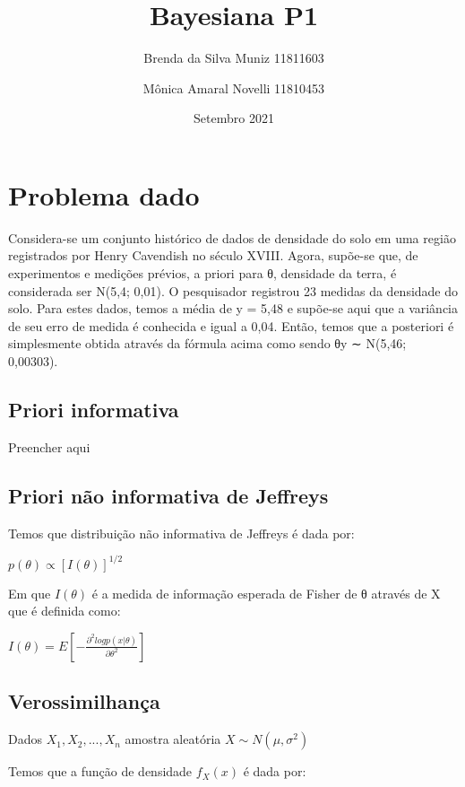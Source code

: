 \documentclass[
]{article}
\title{Bayesiana P1}
\author{Brenda da Silva Muniz 11811603 \and Mônica Amaral Novelli 11810453}
\date{Setembro 2021}
\begin{document}
\maketitle

\hypertarget{problema-dado}{%
\section{Problema dado}\label{problema-dado}}

Considera-se um conjunto histórico de dados de densidade do solo em uma
região registrados por Henry Cavendish no século XVIII. Agora, supõe-se
que, de experimentos e medições prévios, a priori para θ, densidade da
terra, é considerada ser N(5,4; 0,01). O pesquisador registrou 23
medidas da densidade do solo. Para estes dados, temos a média de y =
5,48 e supõe-se aqui que a variância de seu erro de medida é conhecida e
igual a 0,04. Então, temos que a posteriori é simplesmente obtida
através da fórmula acima como sendo θ\textbar y ∼ N(5,46; 0,00303).

\hypertarget{priori-informativa}{%
\subsection{Priori informativa}\label{priori-informativa}}

Preencher aqui

\hypertarget{priori-nuxe3o-informativa-de-jeffreys}{%
\subsection{Priori não informativa de
Jeffreys}\label{priori-nuxe3o-informativa-de-jeffreys}}

Temos que distribuição não informativa de Jeffreys é dada por:

\(p(θ) ∝ [I(θ)]^{1/2}\)

Em que \(I(\theta)\) é a medida de informação esperada de Fisher de θ
através de X que é definida como:

\(I(θ) = E[-\frac{∂^2log p(x|\theta)}{∂\theta^2}]\)

\hypertarget{verossimilhanuxe7a}{%
\subsection{Verossimilhança}\label{verossimilhanuxe7a}}

Dados \(X_1, X_2, . . . , X_n\) amostra aleatória \(X ∼ N(μ, σ^2)\)

Temos que a função de densidade \(f_X(x)\) é dada por:
\end{document}
